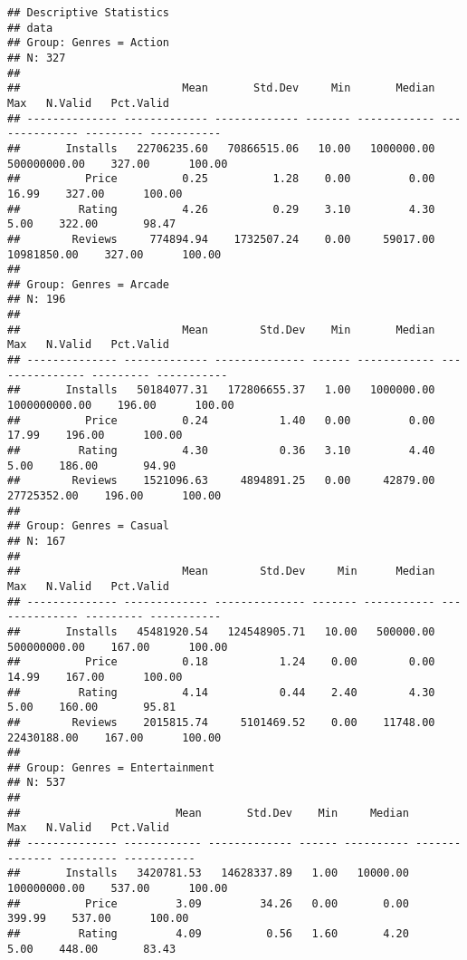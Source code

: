 \documentclass[
]{article}
\begin{document}
\begin{verbatim}
## Descriptive Statistics  
## data  
## Group: Genres = Action  
## N: 327  
## 
##                         Mean       Std.Dev     Min       Median            Max   N.Valid   Pct.Valid
## -------------- ------------- ------------- ------- ------------ -------------- --------- -----------
##       Installs   22706235.60   70866515.06   10.00   1000000.00   500000000.00    327.00      100.00
##          Price          0.25          1.28    0.00         0.00          16.99    327.00      100.00
##         Rating          4.26          0.29    3.10         4.30           5.00    322.00       98.47
##        Reviews     774894.94    1732507.24    0.00     59017.00    10981850.00    327.00      100.00
## 
## Group: Genres = Arcade  
## N: 196  
## 
##                         Mean        Std.Dev    Min       Median             Max   N.Valid   Pct.Valid
## -------------- ------------- -------------- ------ ------------ --------------- --------- -----------
##       Installs   50184077.31   172806655.37   1.00   1000000.00   1000000000.00    196.00      100.00
##          Price          0.24           1.40   0.00         0.00           17.99    196.00      100.00
##         Rating          4.30           0.36   3.10         4.40            5.00    186.00       94.90
##        Reviews    1521096.63     4894891.25   0.00     42879.00     27725352.00    196.00      100.00
## 
## Group: Genres = Casual  
## N: 167  
## 
##                         Mean        Std.Dev     Min      Median            Max   N.Valid   Pct.Valid
## -------------- ------------- -------------- ------- ----------- -------------- --------- -----------
##       Installs   45481920.54   124548905.71   10.00   500000.00   500000000.00    167.00      100.00
##          Price          0.18           1.24    0.00        0.00          14.99    167.00      100.00
##         Rating          4.14           0.44    2.40        4.30           5.00    160.00       95.81
##        Reviews    2015815.74     5101469.52    0.00    11748.00    22430188.00    167.00      100.00
## 
## Group: Genres = Entertainment  
## N: 537  
## 
##                        Mean       Std.Dev    Min     Median            Max   N.Valid   Pct.Valid
## -------------- ------------ ------------- ------ ---------- -------------- --------- -----------
##       Installs   3420781.53   14628337.89   1.00   10000.00   100000000.00    537.00      100.00
##          Price         3.09         34.26   0.00       0.00         399.99    537.00      100.00
##         Rating         4.09          0.56   1.60       4.20           5.00    448.00       83.43

\end{verbatim}
\end{document}
